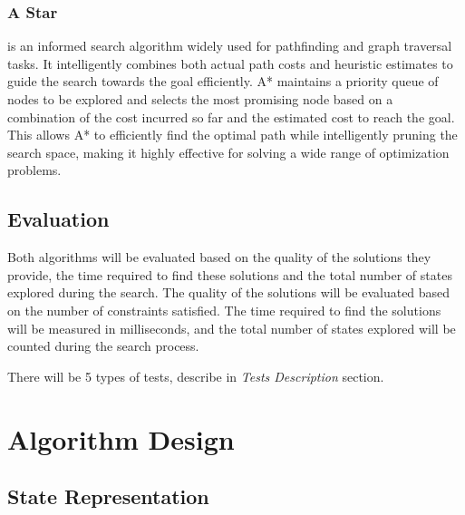 \documentclass[runningheads]{paper}
\begin{document}
\subsubsection{A Star}
is an informed search algorithm widely used for pathfinding and graph 
traversal tasks. It intelligently combines both actual path costs and heuristic 
estimates to guide the search towards the goal efficiently. A* maintains a 
priority queue of nodes to be explored and selects the most promising node 
based on a combination of the cost incurred so far and the estimated cost to 
reach the goal. This allows A* to efficiently find the optimal path while 
intelligently pruning the search space, making it highly effective for solving 
a wide range of optimization problems.


\subsection{Evaluation}
\quad Both algorithms will be evaluated based on the quality of the solutions they
provide, the time required to find these solutions and the total number of
states explored during the search. The quality of the solutions will be
evaluated based on the number of constraints satisfied.  The time required to 
find the solutions will be measured in milliseconds, and the total number of
states explored will be counted during the search process.

There will be 5 types of tests, describe in \textit{Tests Description} section.

\section{Algorithm Design}
\subsection{State Representation}
\end{document}
